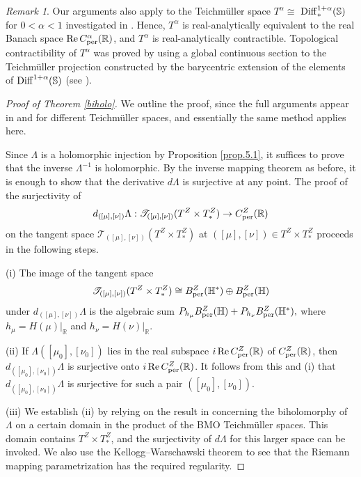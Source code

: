 \documentclass[amstex]{amsart}
\theoremstyle{definition}
\theoremstyle{remark}
\newtheorem{remark}[theorem]{Remark}
\numberwithin{equation}{section}
\begin{document}
\begin{remark}
Our arguments also apply to the Teichm\"uller space $T^\alpha \cong$
\linebreak
${\rm Diff}^{1+\alpha}_*(\mathbb S)$ 
for $0 <\alpha <1$ investigated in \cite{M1}.
Hence, $T^\alpha$ is real-analytically equivalent to 
the real Banach space ${\rm Re}\,C^\alpha_{\rm per}(\mathbb R)$, and
$T^\alpha$ is real-analytically contractible. Topological contractibility of $T^\alpha$ was
proved by using a global continuous section to the Teichm\"uller projection constructed by
the barycentric extension of the elements of ${\rm Diff}^{1+\alpha}(\mathbb S)$ (see \cite[Theorem 1.1]{M0}).
\end{remark}

\begin{proof}[Proof of Theorem \ref{biholo}]
We outline the proof, since the full arguments appear in \cite[Theorem 7.1]{M5} and \cite[Theorem 9.1]{M6} for different
Teichm\"uller spaces, and essentially the same method applies here.

Since $\Lambda$ is a holomorphic injection by Proposition \ref{prop.5.1},
it suffices to prove that the inverse $\Lambda^{-1}$ is holomorphic.
By the inverse mapping theorem as before, it is enough to show that the derivative $d\Lambda$ is surjective
at any point.
The proof of the surjectivity of
$$
d_{([\mu],[\nu])}\Lambda: {\mathscr T}_{([\mu],[\nu])}(T^Z \times T^Z_*) \to C^Z_{\rm per}(\mathbb R)
$$
on the tangent space ${\mathscr T}_{([\mu],[\nu])}(T^Z \times T^Z_*)$ at $([\mu],[\nu]) \in T^Z \times T^Z_*$
proceeds in the following steps.

(i)
The image of the tangent space
$$
{\mathscr T}_{([\mu],[\nu])}(T^Z \times T^Z_*) \cong B^Z_{\rm per}(\mathbb H^*) \oplus B^Z_{\rm per}(\mathbb H)
$$
under $d_{([\mu],[\nu])}\Lambda$ is the algebraic sum
$
P_{h_\mu}B^Z_{\rm per}(\mathbb H)+ P_{h_\nu}B^Z_{\rm per}(\mathbb H^*),
$
where $h_\mu=H(\mu)|_{\mathbb R}$ and $h_\nu=H(\nu)|_{\mathbb R}$.

(ii)
If $\Lambda([\mu_0],[\nu_0])$ lies in the real subspace $i\,{\rm Re}\,C^Z_{\rm per}(\mathbb R)$ of $C^Z_{\rm per}(\mathbb R)$, then
\linebreak 
$d_{([\mu_0],[\nu_0])}\Lambda$ is surjective onto $i\,{\rm Re}\,C^Z_{\rm per}(\mathbb R)$.
It follows from this and (i) that 
\linebreak
$d_{([\mu_0],[\nu_0])}\Lambda$ is surjective for such a pair $([\mu_0],[\nu_0])$.

(iii) 
We establish (ii)
by relying on the result in \cite[Theorem 6.1]{WM-3} concerning the biholomorphy of $\Lambda$ on a certain domain
in the product of the BMO Teichm\"uller spaces. This domain contains $T^Z \times T^Z_*$, and
the surjectivity of $d\Lambda$ for this larger space can be invoked.
We also use the Kellogg--Warschawski theorem to see that the Riemann mapping parametrization has the required regularity.


\end{proof}
\end{document}
